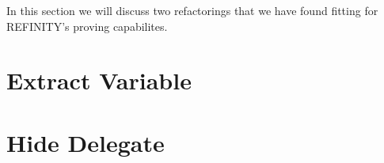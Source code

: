 In this section we will discuss two refactorings that we have found fitting for REFINITY's proving capabilites.

\section{Extract Variable}


\section{Hide Delegate}

